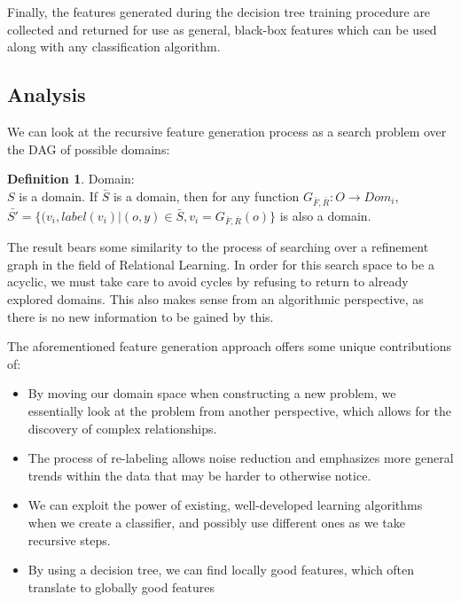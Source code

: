 \documentclass{article}
\theoremstyle{definition}
\newtheorem{defn}{Definition}[section]
\begin{document}
Finally, the features generated during the decision tree training procedure are collected and returned for use as general, black-box features which can be used along with any classification algorithm.

\subsection{Analysis}


We can look at the recursive feature generation process as a search problem over the DAG of possible domains:
\begin{defn} Domain:\\%
	$S$ is a domain.
	If $\bar{S}$ is a domain, then for any function $G_{\bar{F},\bar{R}}: O\rightarrow Dom_i$, $\bar{S'}=\{(v_i,label(v_i)|(o,y)\in \bar{S}, v_i=G_{\bar{F},\bar{R}}(o)\}$ is also a domain.
\end{defn}
The result bears some similarity to the process of searching over a refinement graph in the field of Relational Learning.
In order for this search space to be a acyclic, we must take care to avoid cycles by refusing to return to already explored domains. This also makes sense from an algorithmic perspective, as there is no new information to be gained by this.

The aforementioned feature generation approach offers some unique contributions of:
\begin{itemize}
	\item By moving our domain space when constructing a new problem, we essentially look at the problem from another perspective, which allows for the discovery of complex relationships.
	\item The process of re-labeling allows noise reduction and emphasizes more general trends within the data that may be harder to otherwise notice.
	\item We can exploit the power of existing, well-developed learning algorithms when we create a classifier, and possibly use different ones as we take recursive steps.
	\item By using a decision tree, we can find locally good features, which often translate to globally good features
\end{itemize}
\end{document}
